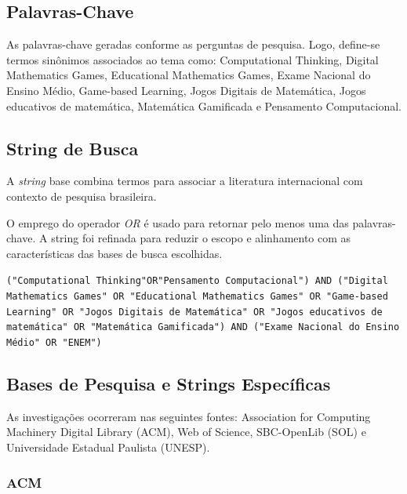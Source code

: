 \documentclass[12pt]{article}
\begin{document}
\subsection{Palavras-Chave}

As palavras-chave geradas conforme as perguntas de pesquisa. Logo, define-se termos sinônimos associados ao tema como: Computational Thinking, Digital Mathematics Games, Educational Mathematics Games, Exame Nacional do Ensino Médio, Game-based Learning, Jogos Digitais de Matemática, Jogos educativos de matemática, Matemática Gamificada e Pensamento Computacional.

\subsection{String de Busca}

A \textit{string} base combina termos para associar a literatura internacional com contexto de pesquisa brasileira.

O emprego do operador \textit{OR} é usado para retornar pelo menos uma das palavras-chave. A string foi refinada para reduzir o escopo e alinhamento com as características das bases de busca escolhidas.

\begin{center}
\texttt{("Computational Thinking"OR"Pensamento Computacional") AND ("Digital Mathematics Games" OR "Educational Mathematics Games" OR "Game-based Learning" OR "Jogos Digitais de Matemática" OR "Jogos educativos de matemática" OR "Matemática Gamificada") AND ("Exame Nacional do Ensino Médio" OR "ENEM")}
\end{center}

\subsection{Bases de Pesquisa e Strings Específicas}

As investigações ocorreram nas seguintes fontes: Association for Computing Machinery Digital Library (ACM), Web of Science, SBC-OpenLib (SOL) e Universidade Estadual Paulista (UNESP).

\subsubsection{ACM}
\end{document}
